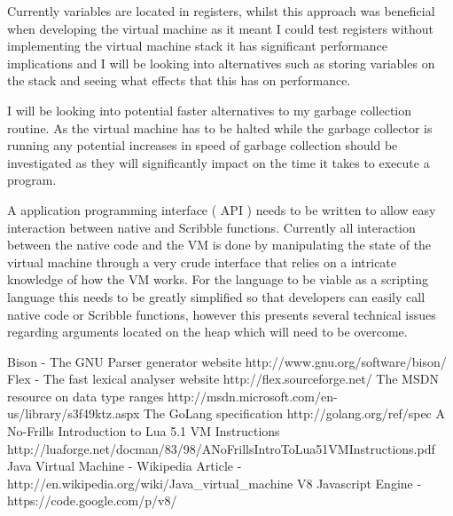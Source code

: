 \documentclass[]{final_report}
\begin{document}
Currently variables are located in registers, whilst this approach was beneficial when developing the virtual machine as it meant I could test registers without implementing the virtual machine stack it has significant performance implications and I will be looking into alternatives such as storing variables on the stack and seeing what effects that this has on performance.

I will be looking into potential faster alternatives to my garbage collection routine. As the virtual machine has to be halted while the garbage collector is running any potential increases in speed of garbage collection should be investigated as they will significantly impact on the time it takes to execute a program.

A application programming interface ( API ) needs to be written to allow easy interaction between native and Scribble functions. Currently all interaction between the native code and the VM is done by manipulating the state of the virtual machine through a very crude interface that relies on a intricate knowledge of how the VM works. For the language to be viable as a scripting language this needs to be greatly simplified so that developers can easily call native code or Scribble functions, however this presents several technical issues regarding arguments located on the heap which will need to be overcome.

\newpage
\begin{thebibliography}{99}
 Bison - The GNU Parser generator website http://www.gnu.org/software/bison/
 Flex - The fast lexical analyser website http://flex.sourceforge.net/
 The MSDN resource on data type ranges http://msdn.microsoft.com/en-us/library/s3f49ktz.aspx
 The GoLang specification http://golang.org/ref/spec
 A No-Frills Introduction to Lua 5.1 VM Instructions http://luaforge.net/docman/83/98/ANoFrillsIntroToLua51VMInstructions.pdf‎
 Java Virtual Machine - Wikipedia Article - http://en.wikipedia.org/wiki/Java\_virtual\_machine
 V8 Javascript Engine - https://code.google.com/p/v8/
\end{thebibliography}
\label{endpage}
\end{document}
